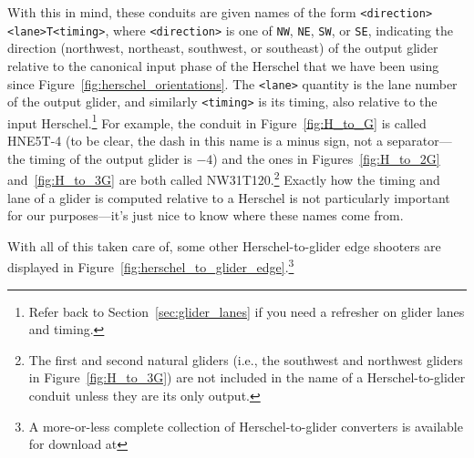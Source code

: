 With this in mind, these conduits are given names of the form \verb|<direction><lane>T<timing>|, where \verb|<direction>| is one of \verb|NW|, \verb|NE|, \verb|SW|, or \verb|SE|, indicating the direction (northwest, northeast, southwest, or southeast) of the output glider relative to the canonical input phase of the Herschel that we have been using since Figure~\ref{fig:herschel_orientations}. The \verb|<lane>| quantity is the lane number of the output glider, and similarly \verb|<timing>| is its timing, also relative to the input Herschel.\footnote{Refer back to Section~\ref{sec:glider_lanes} if you need a refresher on glider lanes and timing.} For example, the conduit in Figure~\ref{fig:H_to_G} is called HNE5T-4 (to be clear, the dash in this name is a minus sign, not a separator---the timing of the output glider is $-4$) and the ones in Figures~\ref{fig:H_to_2G} and~\ref{fig:H_to_3G} are both called NW31T120.\footnote{The first and second natural gliders (i.e., the southwest and northwest gliders in Figure~\ref{fig:H_to_3G}) are not included in the name of a Herschel-to-glider conduit unless they are its only output.} Exactly how the timing and lane of a glider is computed relative to a Herschel is not particularly important for our purposes---it's just nice to know where these names come from.

With all of this taken care of, some other Herschel-to-glider edge shooters are displayed in Figure~\ref{fig:herschel_to_glider_edge}.\footnote{A more-or-less complete collection of Herschel-to-glider converters is available for download at }

